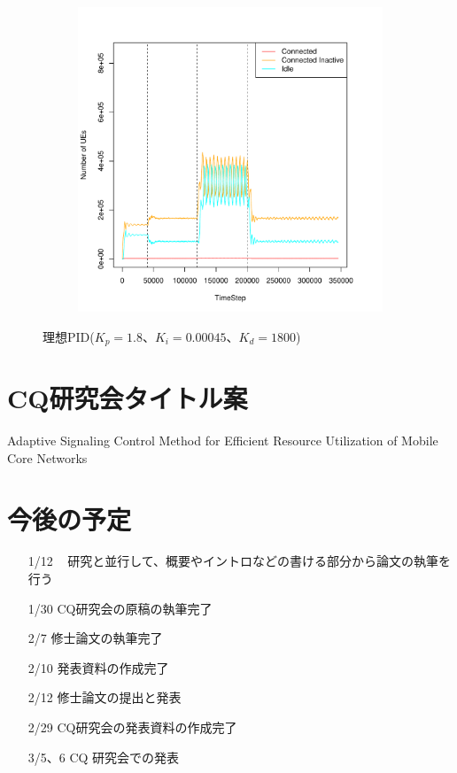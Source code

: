 \documentclass[a4j]{ujarticle}
\begin{document}
\begin{figure}[htbp]
\begin{subfigure}{0.49\hsize}
   \centering
   \includegraphics[width=1.0\hsize]{scenario_7_stateBreakdown_0_691200_1-8_0-00045_1800_0_addIn6000s_random.pdf}
   \label{subfig:scenario_7_stateBreakdown_0_691200_1-8_0-00045_1800_0_addIn6000s_random}
 \end{subfigure}
 \caption{理想PID($K_p = 1.8、K_i = 0.00045、K_d = 1800$)}
 \label{fig:result_pid_scenario7_addIn6000s_random}
\end{figure}
\clearpage

\section{CQ研究会タイトル案}
Adaptive Signaling Control Method for Efficient Resource Utilization of Mobile Core Networks

\section{今後の予定}
  \begin{itemize}
    \item [1/12 ~] 研究と並行して、概要やイントロなどの書ける部分から論文の執筆を行う
    \item [1/30] CQ研究会の原稿の執筆完了
    \item [2/7] 修士論文の執筆完了
    \item [2/10] 発表資料の作成完了
    \item [2/12] 修士論文の提出と発表
    \item [2/29] CQ研究会の発表資料の作成完了
    \item [3/5、6] CQ 研究会での発表
  \end{itemize}
\end{document}

